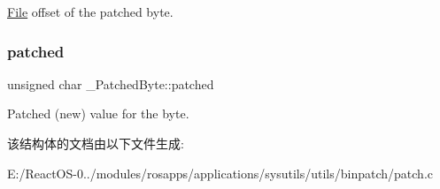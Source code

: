 \hyperlink{class_file}{File} offset of the patched byte. \mbox{\label{struct___patched_byte_adc73f6f9fcfde5c5b97b7ed43fdc13c0}} 
\subsubsection{\texorpdfstring{patched}{patched}}
{\footnotesize\ttfamily unsigned char \+\_\+\+Patched\+Byte\+::patched}

Patched (new) value for the byte. 

该结构体的文档由以下文件生成\+:\begin{DoxyCompactItemize}
\item 
E\+:/\+React\+O\+S-\/0../modules/rosapps/applications/sysutils/utils/binpatch/patch.\+c\end{DoxyCompactItemize}
